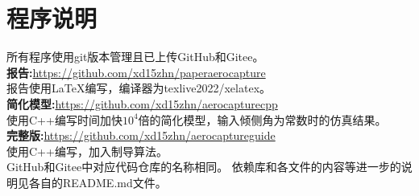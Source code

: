 \section{程序说明}
所有程序使用git版本管理且已上传GitHub和Gitee。 \\
\textbf{报告:}\url{https://github.com/xd15zhn/paperaerocapture} \\
报告使用\LaTeX 编写，编译器为texlive2022/xelatex。\\
\textbf{简化模型:}\url{https://github.com/xd15zhn/aerocapturecpp} \\
使用C++编写时间加快$10^4$倍的简化模型，输入倾侧角为常数时的仿真结果。 \\
\textbf{完整版:}\url{https://github.com/xd15zhn/aerocaptureguide} \\
使用C++编写，加入制导算法。\\
GitHub和Gitee中对应代码仓库的名称相同。
依赖库和各文件的内容等进一步的说明见各自的README.md文件。

